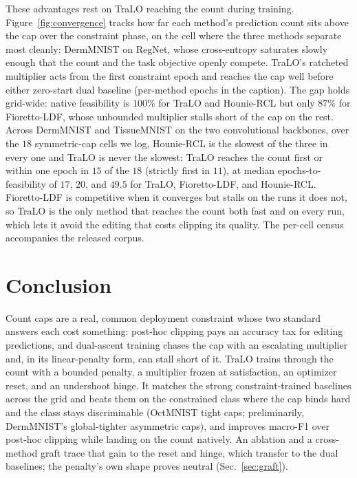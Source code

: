 \documentclass[letterpaper]{article} %
\begin{document}
These advantages rest on TraLO reaching the count during
training. Figure~\ref{fig:convergence} tracks how far each
method's prediction count sits above the cap over the constraint phase, on the cell where
the three methods separate most cleanly: DermMNIST on RegNet, whose cross-entropy
saturates slowly enough that the count and the task objective openly compete. TraLO's
ratcheted multiplier acts from the first constraint epoch and reaches the cap well before
either zero-start dual baseline (per-method epochs in the caption). The gap holds
grid-wide: native feasibility is $100\%$
for TraLO and Hounie-RCL but only $87\%$ for Fioretto-LDF, whose unbounded multiplier stalls
short of the cap on the rest. Across DermMNIST and TissueMNIST on the two convolutional
backbones, over the $18$ symmetric-cap cells we log, Hounie-RCL is the slowest of the three
in every one and TraLO is never the slowest: TraLO reaches the count first or within one
epoch in $15$ of the $18$ (strictly first in $11$), at median epochs-to-feasibility of $17$,
$20$, and $49.5$ for TraLO, Fioretto-LDF, and Hounie-RCL. Fioretto-LDF is competitive when
it converges but stalls on the runs it does not, so TraLO is the only method that reaches
the count both fast and on every run, which lets it avoid the editing that costs clipping
its quality. The per-cell census accompanies the released corpus.

\section{Conclusion}

Count caps are a real, common deployment constraint whose two standard answers each
cost something: post-hoc clipping pays an accuracy tax for editing
predictions, and dual-ascent training chases the cap with an escalating multiplier and,
in its linear-penalty form, can stall short of it. TraLO trains through the count with a
bounded penalty, a multiplier frozen at satisfaction, an optimizer reset, and an
undershoot hinge. It matches the strong constraint-trained baselines across the grid and
beats them on the constrained class where the cap binds hard and the class stays
discriminable (OctMNIST tight caps; preliminarily, DermMNIST's
global-tighter asymmetric caps), and improves macro-F1 over post-hoc clipping while
landing on the count natively. An ablation and a cross-method graft trace that gain to
the reset and hinge, which transfer to the dual baselines; the penalty's own shape proves
neutral (Sec.~\ref{sec:graft}).
\end{document}
